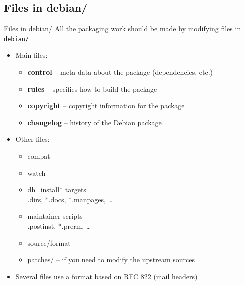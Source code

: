 \documentclass[10pt,final]{beamer}
\begin{document}
\subsection{Files in debian/}
\begin{frame}{Files in debian/}
  All the packaging work should be made by modifying files in \texttt{debian/}
  \hbr
  \begin{itemize}
  \item Main files:
    \begin{itemize}
    \item \textbf{control} -- meta-data about the package (dependencies, etc.)
    \item \textbf{rules} -- specifies how to build the package
    \item \textbf{copyright} -- copyright information for the package
    \item \textbf{changelog} -- history of the Debian package
    \end{itemize}
    \hbr
  \item Other files:
    \begin{itemize}
    \item compat
    \item watch
    \item dh\_install* targets\\
      {\small *.dirs, *.docs, *.manpages, \ldots}
    \item maintainer scripts\\
      {\small *.postinst, *.prerm, \ldots}
    \item source/format
    \item patches/ -- if you need to modify the upstream sources
    \end{itemize}
    \hbr
  \item Several files use a format based on RFC 822 (mail headers)
  \end{itemize}
\end{frame}
\end{document}
